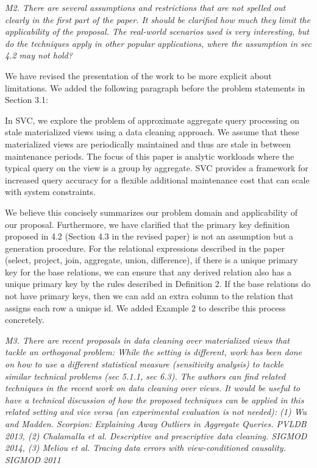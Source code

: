 \vspace{1em}
\emph{M2. There are several assumptions and restrictions that are not spelled out clearly in the first part of the paper. It should be clarified how much they limit the applicability of the proposal. The real-world scenarios used is very interesting, but do the techniques apply in other popular applications, where the assumption in sec 4.2 may not hold?}

We have revised the presentation of the work to be more explicit about limitations. We added the following paragraph before the problem statements in Section 3.1:
\begin{displayquote}In SVC, we explore the problem of approximate aggregate query
processing on stale materialized views using a data cleaning approach.
We assume that these materialized views are periodically
maintained and thus are stale in between maintenance periods. The
focus of this paper is analytic workloads where the typical query on the view is a group by aggregate. SVC provides a framework for increased
query accuracy for a flexible additional maintenance cost that can
scale with system constraints.\end{displayquote}

We believe this concisely summarizes our problem domain and applicability of our proposal. 
Furthermore, we have clarified that the primary key definition proposed in 4.2 
(Section 4.3 in the revised paper) is not an assumption but a generation procedure. For the relational expressions described in the paper (select, project, join, aggregate, union, difference), if there is a unique primary key for the base relations, we can ensure that any derived relation also has a unique primary key by the rules described in Definition 2. If the base relations do not have primary keys, then we can add an extra column to the relation that assigns each row a unique id. We added Example 2 to describe this process concretely.

\vspace{1em}
\emph{M3. There are recent proposals in data cleaning over materialized views that tackle an orthogonal problem: While the setting is different, work has been done on how to use a different statistical measure (sensitivity analysis) to tackle similar technical problems (sec 5.1.1, sec 6.3). The authors can find related techniques in the recent work on data cleaning over views. It would be useful to have a technical discussion of how the proposed techniques can be applied in this related setting and vice versa (an experimental evaluation is not needed): (1) Wu and Madden. Scorpion: Explaining Away Outliers in Aggregate Queries. PVLDB 2013, (2) Chalamalla et al. Descriptive and prescriptive data cleaning. SIGMOD 2014, (3) Meliou et al. Tracing data errors with view-conditioned causality. SIGMOD 2011}

